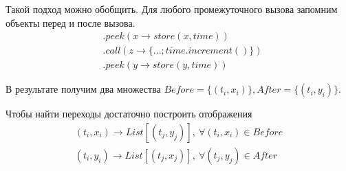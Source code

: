 \begin{frame}
\frametitle{\insertsection} 
\framesubtitle{\insertsubsection}
Такой подход можно обобщить.
Для любого промежуточного вызова запомним объекты перед и после вызова.
\begin{align*}
	&.peek(x \rightarrow store(x, time)) \\
	&.call(z \rightarrow \{...; time.increment()\})\\
	&.peek(y \rightarrow store(y, time))
\end{align*}

В результате получим два множества $Before = \{(t_i, x_i)\}, After = \{(t_i, y_i)\}$. 

Чтобы найти переходы достаточно построить отображения
\begin{align*}
	(t_i, x_i) \rightarrow List[(t_j, y_j)], \ \forall (t_i, x_i) \in Before \\
	(t_i, y_i) \rightarrow List[(t_j, x_j)], \ \forall (t_j, y_j) \in After
\end{align*}

\end{frame}
